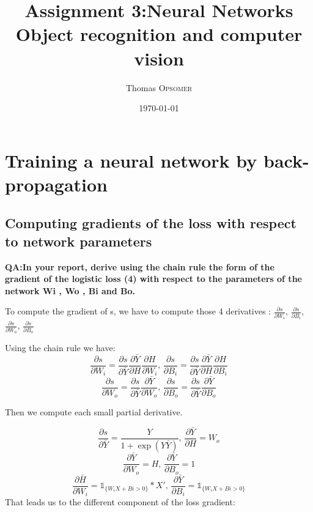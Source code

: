 \documentclass[a4paper,11pt]{exam}
\title{Assignment 3:Neural Networks \\ Object recognition and computer vision} %
\author{Thomas \textsc{Opsomer}} %
\date{\today} %
\begin{document}
\maketitle %




\section{Training a neural network by back-propagation}

\subsection{Computing gradients of the loss with respect to network parameters}

\textbf{QA:In your report, derive using the chain rule the form of the gradient of the logistic loss (4) with respect to the parameters of the network Wi , Wo , Bi and Bo.\\}

To compute the gradient of s, we have to compute those 4 derivatives :
$\frac{\partial s}{\partial W_i}$,
$\frac{\partial s}{\partial B_i}$,
$\frac{\partial s}{\partial W_o}$,
$\frac{\partial s}{\partial B_o}$

Using the chain rule we have:
\[
\frac{\partial s}{\partial W_i}
   = \frac{\partial s}{\partial \bar{Y}} \frac{\partial \bar{Y}}{\partial H} \frac{\partial H}{\partial W_i}
\text{, }
\frac{\partial s}{\partial B_i}
   = \frac{\partial s}{\partial \bar{Y}} \frac{\partial \bar{Y}}{\partial H} \frac{\partial H}{\partial B_i}
\]
\[
\frac{\partial s}{\partial W_o}
   = \frac{\partial s}{\partial \bar{Y}} \frac{\partial \bar{Y}}{\partial W_o}
\text{, }
\frac{\partial s}{\partial B_o}
   = \frac{\partial s}{\partial \bar{Y}} \frac{\partial \bar{Y}}{\partial B_o}
\]

Then we compute each small partial derivative.

\[
\frac{\partial s}{\partial \bar{Y}}
   = \frac{Y}{1 + \exp(Y\bar{Y})}
\text{, }
\frac{\partial \bar{Y}}{\partial H}
   = W_o
\]
\[
\frac{\partial \bar{Y}}{\partial W_o}
   = H
\text{, } 
\frac{\partial \bar{Y}}{\partial B_o}
   = 1
\]
\[
\frac{\partial \bar{H}}{\partial W_i}
   = \mathbb 1_{\{W_iX + Bi > 0\}} * X'
\text{, } 
\frac{\partial \bar{Y}}{\partial B_i}
   = \mathbb 1_{\{W_iX + Bi > 0\}}
\]
That leads us to the different component of the loss gradient:
\end{document}
